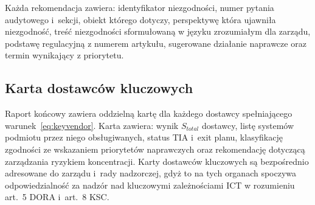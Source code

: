 \noindent Każda rekomendacja zawiera: identyfikator
niezgodności, numer pytania audytowego i~sekcji,
obiekt którego dotyczy, perspektywę która ujawniła
niezgodność, treść niezgodności sformułowaną
w języku zrozumiałym dla zarządu,
podstawę regulacyjną z numerem artykułu,
sugerowane działanie naprawcze oraz termin
wynikający z priorytetu.

\subsection{Karta dostawców kluczowych}
\label{sec:karta-dostawcow}

Raport końcowy zawiera oddzielną kartę dla każdego
dostawcy spełniającego warunek~\eqref{eq:keyvendor}.
Karta zawiera: wynik $S_{total}$ dostawcy,
listę systemów podmiotu przez niego obsługiwanych,
status TIA i~exit planu, klasyfikację zgodności
ze wskazaniem priorytetów naprawczych oraz
rekomendację dotyczącą zarządzania ryzykiem
koncentracji. Karty dostawców kluczowych
są bezpośrednio adresowane do zarządu i~rady
nadzorczej, gdyż to na tych organach spoczywa
odpowiedzialność za nadzór nad kluczowymi
zależnościami ICT w rozumieniu art.~5 DORA
i~art.~8 KSC.










